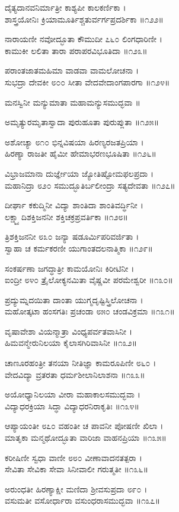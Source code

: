 ದೈತ್ಯದಾನವನಿರ್ಮಾತ್ರೀ ಕಾಶ್ಯಪೀ ಕಾಲಕರ್ಣಿಕಾ ।\\
ಶಾಸ್ತ್ರಯೋನಿಃ ಕ್ರಿಯಾಮೂರ್ತಿಶ್ಚತುರ್ವರ್ಗಪ್ರದರ್ಶಿಕಾ ॥೧೨೨॥

ನಾರಾಯಣೀ ನವೋದ್ಭೂತಾ ಕೌಮುದೀ ೭೬೦ ಲಿಂಗಧಾರಿಣೀ ।\\
ಕಾಮುಕೀ ಲಲಿತಾ ತಾರಾ ಪರಾಪರವಿಭೂತಿದಾ ॥೧೨೩॥

ಪರಾಂತಜಾತಮಹಿಮಾ ವಾಡವಾ ವಾಮಲೋಚನಾ ।\\
ಸುಭದ್ರಾ ದೇವಕೀ ೮೦೦ ಸೀತಾ ವೇದವೇದಾಂಗಪಾರಗಾ ॥೧೨೪॥

ಮನಸ್ವಿನೀ ಮನ್ಯುಮಾತಾ ಮಹಾಮನ್ಯುಸಮುದ್ಭವಾ ॥

ಅಮೃತ್ಯುರಮೃತಾಸ್ವಾದಾ ಪುರುಹೂತಾ ಪುರುಪ್ಲುತಾ ॥೧೨೫॥

ಅಶೋಚ್ಯಾ ೮೧೦ ಭಿನ್ನವಿಷಯಾ ಹಿರಣ್ಯರಜತಪ್ರಿಯಾ ।\\
ಹಿರಣ್ಯಾ ರಾಜತೀ ಹೈಮೀ ಹೇಮಾಭರಣಭೂಷಿತಾ ॥೧೨೬॥

ವಿಭ್ರಾಜಮಾನಾ ದುರ್ಜ್ಞೇಯಾ ಜ್ಯೋತಿಷ್ಟೋಮಫಲಪ್ರದಾ ।\\
ಮಹಾನಿದ್ರಾ ೮೨೦ ಸಮುದ್ಭೂತಿರ್ಬಲೀಂದ್ರಾ ಸತ್ಯದೇವತಾ ॥೧೨೭॥

ದೀರ್ಘಾ ಕಕುದ್ಮಿನೀ ವಿದ್ಯಾ ಶಾಂತಿದಾ ಶಾಂತಿವರ್ದ್ಧಿನೀ ।\\
ಲಕ್ಷ್ಮ್ಯಾದಿಶಕ್ತಿಜನನೀ ಶಕ್ತಿಚಕ್ರಪ್ರವರ್ತಿಕಾ ॥೧೨೮॥

ತ್ರಿಶಕ್ತಿಜನನೀ ೮೩೦ ಜನ್ಯಾ ಷಡೂರ್ಮಿಪರಿವರ್ಜಿತಾ ।\\
ಸ್ವಾಹಾ ಚ ಕರ್ಮಕರಣೀ ಯುಗಾಂತದಲನಾತ್ಮಿಕಾ ॥೧೨೯॥

ಸಂಕರ್ಷಣಾ ಜಗದ್ಧಾತ್ರೀ ಕಾಮಯೋನಿಃ ಕಿರೀಟಿನೀ ।\\
ಐಂದ್ರೀ ೮೪೦ ತ್ರೈಲೋಕ್ಯನಮಿತಾ ವೈಷ್ಣವೀ ಪರಮೇಶ್ವರೀ ॥೧೩೦॥

ಪ್ರದ್ಯುಮ್ನದಯಿತಾ ದಾಂತಾ ಯುಗ್ಮದೃಷ್ಟಿಸ್ತ್ರಿಲೋಚನಾ ।\\
ಮಹೋತ್ಕಟಾ ಹಂಸಗತಿಃ ಪ್ರಚಂಡಾ ೮೫೦ ಚಂಡವಿಕ್ರಮಾ ॥೧೩೧॥

ವೃಷಾವೇಶಾ ವಿಯನ್ಮಾತ್ರಾ ವಿಂಧ್ಯಪರ್ವತವಾಸಿನೀ ।\\
ಹಿಮವನ್ಮೇರುನಿಲಯಾ ಕೈಲಾಸಗಿರಿವಾಸಿನೀ ॥೧೩೨॥

ಚಾಣೂರಹಂತ್ರೀ ತನಯಾ ನೀತಿಜ್ಞಾ ಕಾಮರೂಪಿಣೀ ೮೬೦ ।\\
ವೇದವಿದ್ಯಾ ವ್ರತರತಾ ಧರ್ಮಶೀಲಾನಿಲಾಶನಾ ॥೧೩೩॥

ಅಯೋಧ್ಯಾನಿಲಯಾ ವೀರಾ ಮಹಾಕಾಲಸಮುದ್ಭವಾ ।\\
ವಿದ್ಯಾಧರಕ್ರಿಯಾ ಸಿದ್ಧಾ ವಿದ್ಯಾಧರನಿರಾಕೃತಿಃ ॥೧೩೪॥

ಆಪ್ಯಾಯಂತೀ ೮೭೦ ವಹಂತೀ ಚ ಪಾವನೀ ಪೋಷಣೀ ಖಿಲಾ ।\\
ಮಾತೃಕಾ ಮನ್ಮಥೋದ್ಭೂತಾ ವಾರಿಜಾ ವಾಹನಪ್ರಿಯಾ ॥೧೩೫॥

ಕರೀಷಿಣೀ ಸ್ವಧಾ ವಾಣೀ ೮೮೦ ವೀಣಾವಾದನತತ್ಪರಾ ।\\
ಸೇವಿತಾ ಸೇವಿಕಾ ಸೇವಾ ಸಿನೀವಾಲೀ ಗರುತ್ಮತೀ ॥೧೩೬॥

ಅರುಂಧತೀ ಹಿರಣ್ಯಾಕ್ಷೀ ಮಣಿದಾ ಶ್ರೀವಸುಪ್ರದಾ ೮೯೦ ।\\
ವಸುಮತೀ ವಸೋರ್ಧಾರಾ ವಸುಂಧರಾಸಮುದ್ಭವಾ ॥೧೩೭॥

